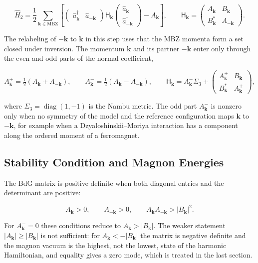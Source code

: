 \[
\hat H_2=\frac12\sum_{\mathbf k\in\mathrm{MBZ}}\left[
\begin{pmatrix}\hat a_{\mathbf k}^\dagger & \hat a_{-\mathbf k}\end{pmatrix}
\mathsf H_{\mathbf k}
\begin{pmatrix}\hat a_{\mathbf k}\\ \hat a_{-\mathbf k}^\dagger\end{pmatrix}
-A_{\mathbf k}\right],
\qquad
\mathsf H_{\mathbf k}=\begin{pmatrix}A_{\mathbf k} & B_{\mathbf k}\\ B_{\mathbf k}^* & A_{-\mathbf k}\end{pmatrix}.
\]

The relabeling of \(-\mathbf k\) to \(\mathbf k\) in this step uses that the MBZ momenta form a set closed under inversion. The momentum \(\mathbf k\) and its partner \(-\mathbf k\) enter only through the even and odd parts of the normal coefficient,

\[
A_{\mathbf k}^{+}=\tfrac12\left(A_{\mathbf k}+A_{-\mathbf k}\right),
\qquad
A_{\mathbf k}^{-}=\tfrac12\left(A_{\mathbf k}-A_{-\mathbf k}\right),
\qquad
\mathsf H_{\mathbf k}=A_{\mathbf k}^{-}\Sigma_3+\begin{pmatrix}A_{\mathbf k}^{+} & B_{\mathbf k}\\ B_{\mathbf k}^* & A_{\mathbf k}^{+}\end{pmatrix},
\]

where \(\Sigma_3=\operatorname{diag}(1,-1)\) is the Nambu metric. The odd part \(A_{\mathbf k}^{-}\) is nonzero only when no symmetry of the model and the reference configuration maps \(\mathbf k\) to \(-\mathbf k\), for example when a Dzyaloshinskii--Moriya interaction has a component along the ordered moment of a ferromagnet.

\subsection{Stability Condition and Magnon Energies}

The BdG matrix is positive definite when both diagonal entries and the determinant are positive:

\begin{equation}\label{eq-lswt-example-stability}
A_{\mathbf k}>0,
\qquad
A_{-\mathbf k}>0,
\qquad
A_{\mathbf k}A_{-\mathbf k}>|B_{\mathbf k}|^2.
\end{equation}

For \(A_{\mathbf k}^{-}=0\) these conditions reduce to \(A_{\mathbf k}>|B_{\mathbf k}|\). The weaker statement \(|A_{\mathbf k}|\ge|B_{\mathbf k}|\) is not sufficient: for \(A_{\mathbf k}<-|B_{\mathbf k}|\) the matrix is negative definite and the magnon vacuum is the highest, not the lowest, state of the harmonic Hamiltonian, and equality gives a zero mode, which is treated in the last section.

